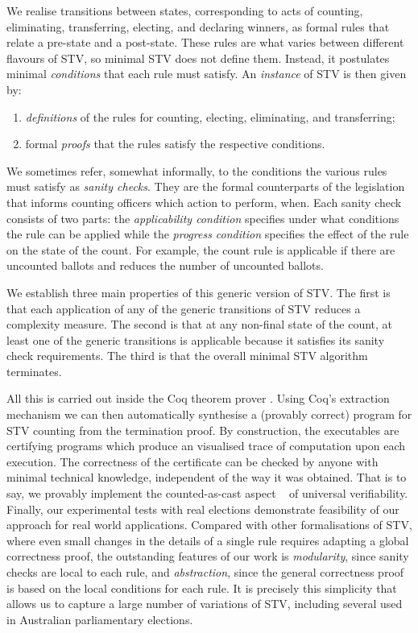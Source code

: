 \documentclass{llncs}
\begin{document}
We realise transitions between states, corresponding to acts of counting,
eliminating, transferring, electing, and declaring winners,
as formal rules that relate a pre-state and a
post-state. These rules are what varies between different flavours
of STV,
so
minimal STV does not define them.
Instead, it
postulates minimal \emph{conditions} that each rule must
satisfy. An \emph{instance} of STV is then given by:
\begin{enumerate}
\item \emph{definitions} of the rules for counting, electing,
eliminating, and transferring;
\item formal \emph{proofs} that the rules satisfy the respective
conditions.
\end{enumerate}

\noindent
We sometimes refer, somewhat informally, to the conditions the various rules must
satisfy as \emph{sanity checks}. They are the
formal counterparts of the legislation that informs counting officers
which action to perform, when. 
Each sanity check consists of two parts: 
the \emph{applicability condition}
specifies under what conditions the rule can be applied while
the \emph{progress condition} specifies the effect of the
rule on the state of the count.
For example, the count rule is applicable 
if there are uncounted ballots and reduces
the number of uncounted ballots.

We establish
three  main properties of this generic version of STV. The first
is that each application of any of the generic transitions
of STV 
reduces a complexity measure. The second is that at any
non-final state of the count, at least one of the generic
transitions is applicable because it satisfies its sanity
check requirements. The third is that the overall 
minimal STV algorithm terminates. 

All this is carried out inside the Coq theorem prover
\cite{Bertot:2004:ITP}.  Using Coq's extraction mechanism
\cite{Letouzey:2003:NEC} we can then automatically synthesise a
(provably correct) program for STV counting from the termination
proof.  
By construction, the executables are certifying programs which
produce an visualised trace of computation upon each execution. The
correctness of the certificate can be checked by anyone with minimal
technical knowledge, independent of the way it was obtained. 
That is to say, we provably implement the counted-as-cast
aspect ~\cite{DBLP:journals/iacr/CortierGKMT16} of universal
verifiability. Finally, our experimental tests with real
elections demonstrate feasibility of our approach for  real world
applications. Compared with other formalisations of STV, where
even small changes in the details of a single rule requires adapting
a global correctness proof, the outstanding features of our work
is \emph{modularity}, since sanity checks are local to each
rule, and \emph{abstraction}, since the general correctness proof is based
on the local conditions for each rule. It is precisely this
simplicity that allows us to capture a large number of variations of STV,
including several used in Australian parliamentary elections.
 
\end{document}
